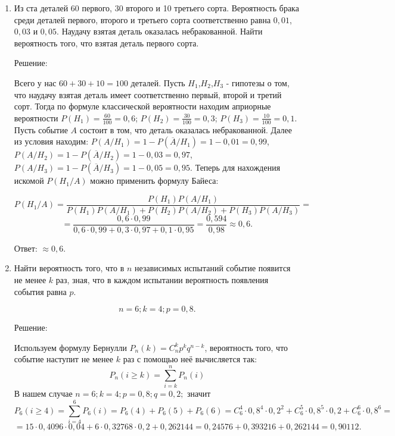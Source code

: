 \documentclass{article}
\renewcommand{\ge}{\ensuremath{\geqslant}}
\begin{document}
\begin{enumerate}
\item %
Из ста деталей 60 первого, 30 второго и 10 третьего сорта. Вероятность брака среди деталей первого, второго и третьего сорта соответственно равна $0,01$, $0,03$ и $0,05$. Наудачу взятая деталь оказалась небракованной. Найти вероятность того, что взятая деталь первого сорта.
\begin{center}Решение:\end{center}
Всего у нас $60+30+10=100$ деталей.  \newline
Пусть $H_1$,$H_2$,$H_3$ - гипотезы о том, что наудачу взятая деталь имеет соответственно первый, второй и третий сорт. \newline Тогда по формуле классической вероятности находим априорные вероятности $P(H_1)=\frac{60}{100}=0,6$; $P(H_2)=\frac{30}{100}=0,3$; $P(H_3)=\frac{10}{100}=0,1$.  \newline Пусть событие $A$ состоит в том, что деталь оказалась небракованной. Далее из условия находим:  \newline $P(A/H_1)=1-P(\overline{A}/H_1)=1-0,01=0,99$,  \newline $P(A/H_2)=1-P(\overline{A}/H_2)=1-0,03=0,97$,  \newline $P(A/H_3)=1-P(\overline{A}/H_3)=1-0,05=0,95$.  \newline Теперь для нахождения искомой $P(H_1/A)$ можно применить формулу Байеса:

$$P(H_1/A)=\frac{P(H_1)P(A/H_1)}{P(H_1)P(A/H_1)+P(H_2)P(A/H_2)+P(H_3)P(A/H_3)}=$$
$$=\frac{0,6\cdot0,99}{0,6\cdot0,99+0,3\cdot0,97+0,1\cdot0,95}=
\frac{0,594}{0,98}\approx0,6.$$

Ответ: $\approx0,6$.

\item %
Найти вероятность того, что в $n$ независимых испытаний событие появится не менее $k$ раз, зная, что в каждом испытании вероятность появления события равна $p$.

$$n=6; k=4; p=0,8.$$
\begin{center}Решение:\end{center}
Используем формулу Бернулли $P_n(k)=C_n^k p^k q^{n-k}$, вероятность того, что событие наступит не менее $k$ раз с помощью неё вычисляется так: $$P_n(i\ge k)=\sum_{i=k}^n P_n(i)$$
В нашем случае $n=6; k=4; p=0,8; q=0,2;$ значит
$$P_6(i\ge 4)=\sum_{i=4}^6 P_6(i)=P_6(4)+P_6(5)+P_6(6)=C_6^4\cdot0,8^4\cdot0,2^2+C_6^5\cdot0,8^5\cdot0,2+C_6^6\cdot0,8^6=$$
$$=15\cdot0,4096\cdot0,04+6\cdot0,32768\cdot0,2+0,262144=0,24576+0,393216+0,262144=0,90112.$$


\end{enumerate}
\end{document}

